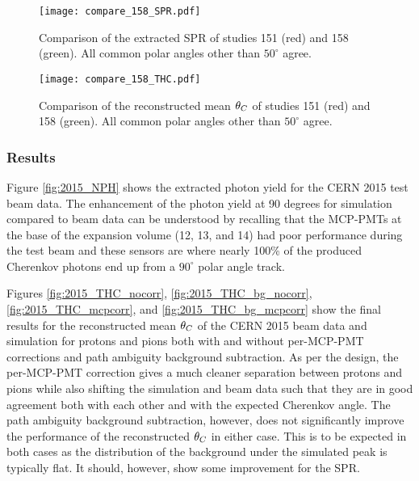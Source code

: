 \begin{figure}[!htb]
	\centering
	\texttt{[image: compare\_158\_SPR.pdf]}
	\caption{Comparison of the extracted SPR of studies 151 (red) and 158 (green). All common polar angles other than $50^\circ$ agree.}
	\label{fig:compare_158_SPR}
\end{figure}

\begin{figure}[!htb]
	\centering
	\texttt{[image: compare\_158\_THC.pdf]}
	\caption{Comparison of the reconstructed mean $\theta_{C}$ of studies 151 (red) and 158 (green). All common polar angles other than $50^\circ$ agree.}
	\label{fig:compare_158_THC}
\end{figure}

\subsubsection{Results}
Figure \ref{fig:2015_NPH} shows the extracted photon yield for the CERN 2015 test beam data. The enhancement of the photon yield at 90 degrees for simulation compared to beam data can be understood by recalling that the MCP-PMTs at the base of the expansion volume (12, 13, and 14) had poor performance during the test beam and these sensors are where nearly 100\% of the produced Cherenkov photons end up from a $90^\circ$ polar angle track.

Figures \ref{fig:2015_THC_nocorr}, \ref{fig:2015_THC_bg_nocorr}, \ref{fig:2015_THC_mcpcorr}, and \ref{fig:2015_THC_bg_mcpcorr} show the final results for the reconstructed mean $\theta_{C}$ of the CERN 2015 beam data and simulation for protons and pions both with and without per-MCP-PMT corrections and path ambiguity background subtraction. As per the design, the per-MCP-PMT correction gives a much cleaner separation between protons and pions while also shifting the simulation and beam data such that they are in good agreement both with each other and with the expected Cherenkov angle. The path ambiguity background subtraction, however, does not significantly improve the performance of the reconstructed $\theta_{C}$ in either case. This is to be expected in both cases as the distribution of the background under the simulated peak is typically flat. It should, however, show some improvement for the SPR.

